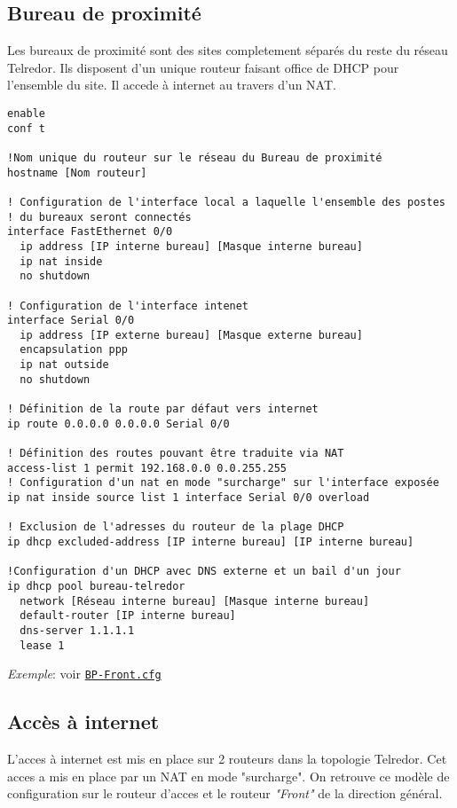 \documentclass{article}
\newcommand{\tlr}{Telredor\xspace}
\newcommand{\seefile}[1]{
  \begin{center}
  \begin{minipage}{0.9\textwidth}
    \emph{Exemple}: voir \texttt{\href{https://github.com/EpicKiwi/Wide-Network-Project-Cesi-A4/blob/master/network/#1}{#1}}
  \end{minipage}
  \end{center}
}
\begin{document}
\subsection{Bureau de proximité}

Les bureaux de proximité sont des sites completement séparés du reste du réseau \tlr.
Ils disposent d'un unique routeur faisant office de DHCP pour l'ensemble du site.
Il accede à internet au travers d'un NAT.

\begin{lstlisting}[caption=Configuration d'un routeur de bureau de proximité]
enable
conf t

!Nom unique du routeur sur le réseau du Bureau de proximité
hostname [Nom routeur]

! Configuration de l'interface local a laquelle l'ensemble des postes
! du bureaux seront connectés
interface FastEthernet 0/0
  ip address [IP interne bureau] [Masque interne bureau]
  ip nat inside
  no shutdown

! Configuration de l'interface intenet
interface Serial 0/0
  ip address [IP externe bureau] [Masque externe bureau]
  encapsulation ppp
  ip nat outside
  no shutdown

! Définition de la route par défaut vers internet
ip route 0.0.0.0 0.0.0.0 Serial 0/0

! Définition des routes pouvant être traduite via NAT
access-list 1 permit 192.168.0.0 0.0.255.255
! Configuration d'un nat en mode "surcharge" sur l'interface exposée
ip nat inside source list 1 interface Serial 0/0 overload

! Exclusion de l'adresses du routeur de la plage DHCP
ip dhcp excluded-address [IP interne bureau] [IP interne bureau]

!Configuration d'un DHCP avec DNS externe et un bail d'un jour
ip dhcp pool bureau-telredor
  network [Réseau interne bureau] [Masque interne bureau]
  default-router [IP interne bureau]
  dns-server 1.1.1.1
  lease 1
\end{lstlisting}

\seefile{BP-Front.cfg}

\subsection{Accès à internet}

L'acces à internet est mis en place sur 2 routeurs dans la topologie \tlr.
Cet acces a mis en place par un NAT en mode "surcharge".
On retrouve ce modèle de configuration sur le routeur d'acces et le routeur \emph{"Front"} de la direction général.
\end{document}
